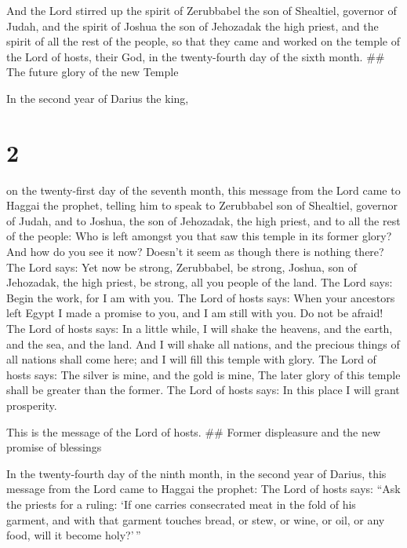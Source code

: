  And the Lord stirred up the spirit of Zerubbabel the son
of Shealtiel, governor of Judah, and the spirit of Joshua the son of
Jehozadak the high priest, and the spirit of all the rest of the people,
so that they came and worked on the temple of the Lord of hosts, their
God,  in the twenty-fourth day of the sixth month. \#\# The
future glory of the new Temple

In the second year of Darius the king,

\hypertarget{section-1}{%
\section{2}\label{section-1}}

 on the twenty-first day of the seventh month, this message
from the Lord came to Haggai the prophet,  telling him to
speak to Zerubbabel son of Shealtiel, governor of Judah, and to Joshua,
the son of Jehozadak, the high priest, and to all the rest of the
people:  Who is left amongst you that saw this temple in its
former glory? And how do you see it now? Doesn't it seem as though there
is nothing there?  The Lord says: Yet now be strong,
Zerubbabel, be strong, Joshua, son of Jehozadak, the high priest, be
strong, all you people of the land. The Lord says: Begin the work, for I
am with you. The Lord of hosts says:  When your ancestors
left Egypt I made a promise to you, and I am still with you. Do not be
afraid!  The Lord of hosts says: In a little while, I will
shake the heavens, and the earth, and the sea, and the land.
 And I will shake all nations, and the precious things of
all nations shall come here; and I will fill this temple with glory. The
Lord of hosts says:  The silver is mine, and the gold is
mine,  The later glory of this temple shall be greater than
the former. The Lord of hosts says: In this place I will grant
prosperity.

This is the message of the Lord of hosts. \#\# Former displeasure and
the new promise of blessings

 In the twenty-fourth day of the ninth month, in the second
year of Darius, this message from the Lord came to Haggai the prophet:
 The Lord of hosts says: ``Ask the priests for a ruling:
 `If one carries consecrated meat in the fold of his
garment, and with that garment touches bread, or stew, or wine, or oil,
or any food, will it become holy?'\,''

